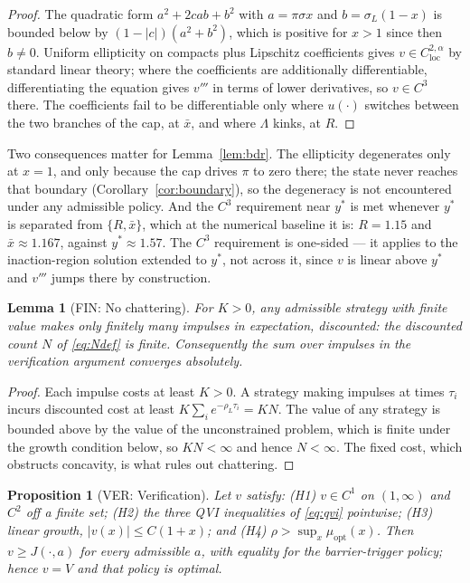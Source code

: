 \documentclass[11pt]{article}
\newtheorem{proposition}{Proposition}
\newtheorem{lemma}{Lemma}
\theoremstyle{remark}
\begin{document}
\begin{proof}
The quadratic form $a^2 + 2cab + b^2$ with $a=\pi\sigma x$ and
$b=\sigma_L(1-x)$ is bounded below by $(1-|c|)(a^2+b^2)$, which is
positive for $x>1$ since then $b \ne 0$. Uniform ellipticity on compacts
plus Lipschitz coefficients gives $v \in C^{2,\alpha}_{\mathrm{loc}}$ by
standard linear theory; where the coefficients are additionally
differentiable, differentiating the equation gives $v'''$ in terms of
lower derivatives, so $v \in C^3$ there. The coefficients fail to be
differentiable only where $u(\cdot)$ switches between the two branches of
the cap, at $\bar x$, and where $\Lambda$ kinks, at $R$.
\end{proof}

\noindent
Two consequences matter for Lemma~\ref{lem:bdr}. The ellipticity
degenerates only at $x=1$, and only because the cap drives $\pi$ to zero
there; the state never reaches that boundary
(Corollary~\ref{cor:boundary}), so the degeneracy is not encountered under
any admissible policy. And the $C^3$ requirement near $y^*$ is met
whenever $y^*$ is separated from $\{R,\bar x\}$, which at the numerical
baseline it is: $R = 1.15$ and $\bar x \approx 1.167$, against
$y^* \approx 1.57$. The $C^3$ requirement is one-sided --- it applies to
the inaction-region solution extended to $y^*$, not across it, since $v$
is linear above $y^*$ and $v'''$ jumps there by construction.

\begin{lemma}[FIN: No chattering]
\label{lem:fin}
For $K>0$, any admissible strategy with finite value makes only finitely
many impulses in expectation, discounted: the discounted count $N$ of
\eqref{eq:Ndef} is finite. Consequently the sum over impulses in the
verification argument converges absolutely.
\end{lemma}

\begin{proof}
Each impulse costs at least $K>0$. A strategy making impulses at times
$\tau_i$ incurs discounted cost at least $K\sum_i e^{-\rho_L\tau_i} = KN$.
The value of any strategy is bounded above by the value of the
unconstrained problem, which is finite under the growth condition below,
so $KN < \infty$ and hence $N<\infty$. The fixed cost, which obstructs
concavity, is what rules out chattering.
\end{proof}

\begin{proposition}[VER: Verification]
\label{prop:ver}
Let $v$ satisfy: (H1) $v \in C^1$ on $(1,\infty)$ and $C^2$ off a finite
set; (H2) the three QVI inequalities of \eqref{eq:qvi} pointwise;
(H3) linear growth, $|v(x)| \le C(1+x)$; and (H4)
$\rho > \sup_x \mu_{\mathrm{opt}}(x)$. Then $v \ge J(\cdot,a)$ for every
admissible $a$, with equality for the barrier-trigger policy; hence
$v = V$ and that policy is optimal.
\end{proposition}
\end{document}
